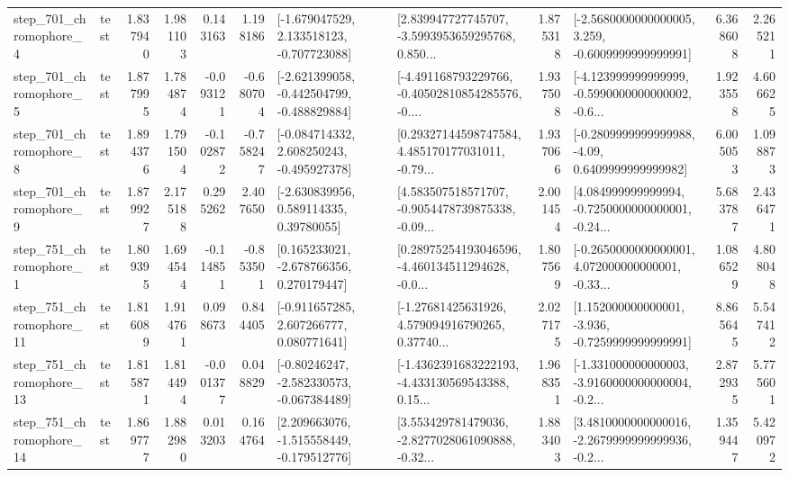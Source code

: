 \begin{tabular}{llrrrrllrlrr}
   step\_701\_chromophore\_4 &      test &      1.837940 &    1.981103 &      0.143163 &  1.198186 &   [-1.679047529, 2.133518123, -0.707723088] &  [2.839947727745707, -3.5993953659295768, 0.850... &       1.875318 &  [-2.5680000000000005, 3.259, -0.6009999999999991] &            6.368608 &          2.265211 \\
   step\_701\_chromophore\_5 &      test &      1.877995 &    1.784874 &     -0.093121 & -0.680704 &  [-2.621399058, -0.442504799, -0.488829884] &  [-4.491168793229766, -0.40502810854285576, -0.... &       1.937508 &  [-4.123999999999999, -0.5990000000000002, -0.6... &            1.923558 &          4.606625 \\
   step\_701\_chromophore\_8 &      test &      1.894376 &    1.791504 &     -0.102872 & -0.758247 &   [-0.084714332, 2.608250243, -0.495927378] &  [0.29327144598747584, 4.485170177031011, -0.79... &       1.937066 &   [-0.2809999999999988, -4.09, 0.6409999999999982] &            6.005053 &          1.098873 \\
   step\_701\_chromophore\_9 &      test &      1.879927 &    2.175188 &      0.295262 &  2.407650 &     [-2.630839956, 0.589114335, 0.39780055] &  [4.583507518571707, -0.9054478739875338, -0.09... &       2.001454 &  [4.084999999999994, -0.7250000000000001, -0.24... &            5.683787 &          2.436471 \\
   step\_751\_chromophore\_1 &      test &      1.809395 &    1.694544 &     -0.114851 & -0.853501 &    [0.165233021, -2.678766356, 0.270179447] &  [0.28975254193046596, -4.460134511294628, -0.0... &       1.807569 &  [-0.2650000000000001, 4.072000000000001, -0.33... &            1.086529 &          4.808048 \\
  step\_751\_chromophore\_11 &      test &      1.816089 &    1.914761 &      0.098673 &  0.844405 &    [-0.911657285, 2.607266777, 0.080771641] &  [-1.27681425631926, 4.579094916790265, 0.37740... &       2.027175 &   [1.152000000000001, -3.936, -0.7259999999999991] &            8.865645 &          5.547412 \\
  step\_751\_chromophore\_13 &      test &      1.815871 &    1.814494 &     -0.001377 &  0.048829 &   [-0.80246247, -2.582330573, -0.067384489] &  [-1.4362391683222193, -4.433130569543388, 0.15... &       1.968351 &  [-1.331000000000003, -3.9160000000000004, -0.2... &            2.872935 &          5.775601 \\
  step\_751\_chromophore\_14 &      test &      1.869777 &    1.882980 &      0.013203 &  0.164764 &   [2.209663076, -1.515558449, -0.179512776] &  [3.553429781479036, -2.8277028061090888, -0.32... &       1.883403 &  [3.4810000000000016, -2.2679999999999936, -0.2... &            1.359447 &          5.420972 \\

\end{tabular}
